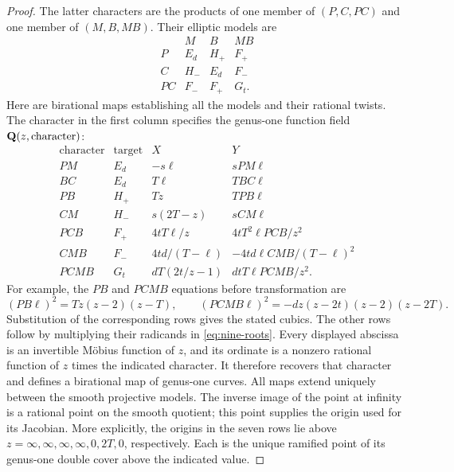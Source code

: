 \begin{proof}
The latter characters are the products of one member of
$(P,C,PC)$ and one member of $(M,B,MB)$.  Their elliptic models are
\begin{equation}\label{eq:nine-character-table}
\begin{array}{c|ccc}
 &M&B&MB\\\hline
 P&E_d&H_+&F_+\\
 C&H_-&E_d&F_-\\
 PC&F_-&F_+&G_t.
\end{array}
\end{equation}
Here are birational maps establishing all the models and their rational
twists.  The character in the first column specifies the genus-one
function field $\mathbf Q(z,\text{character})$:
\begin{equation}\label{eq:nine-map-table}
\begin{array}{c|c|c|c}
\text{character}&\text{target}&X&Y\\\hline
 PM&E_d&-s\ell&sPM\ell\\[1mm]
 BC&E_d&T\ell&TBC\ell\\[1mm]
 PB&H_+&Tz&TPB\ell\\[1mm]
 CM&H_-&s(2T-z)&sCM\ell\\[1mm]
 PCB&F_+&4tT\ell/z&4tT^2\ell PCB/z^2\\[1mm]
 CMB&F_-&4td/(T-\ell)&-4td\ell CMB/(T-\ell)^2\\[1mm]
 PCMB&G_t&dT(2t/z-1)&dtT\ell PCMB/z^2.
\end{array}
\end{equation}
For example, the $PB$ and $PCMB$ equations before transformation are
\[
 (PB\ell)^2=Tz(z-2)(z-T),\qquad
 (PCMB\ell)^2=-dz(z-2t)(z-2)(z-2T).
\]
Substitution of the corresponding rows gives the stated cubics.  The
other rows follow by multiplying their radicands in
\eqref{eq:nine-roots}.  Every displayed abscissa is an invertible
M\"obius function of $z$, and its ordinate is a nonzero rational function
of $z$ times the indicated character.  It therefore recovers that
character and defines a birational map of genus-one curves.  All maps
extend uniquely between the smooth projective models.  The inverse
image of the point at infinity is a rational point on the smooth
quotient; this point supplies the origin used for its Jacobian.
More explicitly, the origins in the seven rows lie above
$z=\infty,\infty,\infty,\infty,0,2T,0$, respectively.
Each is the unique ramified point of its genus-one double cover above
the indicated value.


\end{proof}
